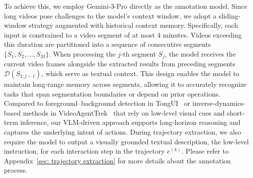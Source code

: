 \documentclass{llmxive}
\begin{document}
To achieve this, we employ Gemini-3-Pro directly as the annotation model. Since long videos pose challenges to the model’s context window, we adopt a sliding-window strategy augmented with historical context memory. Specifically, each input is constrained to a video segment of at most 4 minutes. Videos exceeding this duration are partitioned into a sequence of consecutive segments $\{S_1, S_2, \dots, S_M\}$. 
When processing the $j$-th segment $S_j$, the model receives the current video frames alongside the extracted results from preceding segments $\mathcal{D}(S_{1:j-1})$, which serve as textual context. 
This design enables the model to maintain long-range memory across segments, allowing it to accurately recognize tasks that span segmentation boundaries or depend on prior operations. 
Compared to foreground–background detection in TongUI~\citep{zhang2025tongui} or inverse-dynamics-based methods in VideoAgentTrek~\citep{lu2025videoagenttrek} that rely on low-level visual cues and short-term inference, our VLM-driven approach supports long-horizon reasoning and captures the underlying intent of actions.
During trajectory extraction, we also require the model to output a visually grounded textual description, the low-level instruction, for each interaction step in the trajectory $e^{(k)}$. Please refer to Appendix~\ref{sec: trajectory extraction} for more details about the annotation process.
\end{document}
